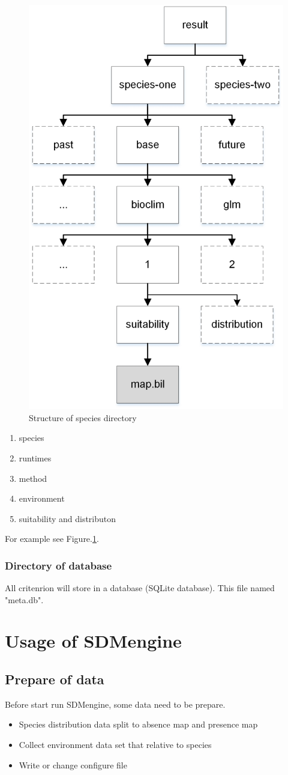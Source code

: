 \documentclass[10pt,a4paper]{report}
\begin{document}
\begin{figure}[h]
\centering
\includegraphics[angle=0,width=0.55\linewidth]{result-directory.jpg}
\caption[workshop]{Structure of species directory}
\label{fig:workshop_structure}
\end{figure}

\begin{enumerate}
\item species
\item runtimes
\item method
\item environment
\item suitability and distributon
\end{enumerate}

For example see Figure.\ref{fig:workshop_structure}.

\subsubsection{Directory of database}
All critenrion will store in a database (SQLite database). This file named "meta.db".

\section{Usage of SDMengine}
\subsection{Prepare of data}
Before start run SDMengine, some data need to be prepare. 
\begin{itemize}
\item Species distribution data split to absence map and presence map
\item Collect environment data set that relative to species
\item Write or change configure file
\end{itemize}
\end{document}
